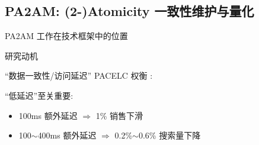\subsection{PA2AM: (2-)Atomicity 一致性维护与量化}

\begin{frame}{PA2AM 工作在技术框架中的位置}
\end{frame}
\begin{frame}{研究动机}
  \vspace{0.20cm}

  \pause
  ``数据一致性/访问延迟'' PACELC 权衡 :



  \pause

  ``低延迟''至关重要:
  \begin{itemize}
	\item 100ms 额外延迟 $\Rightarrow$ 1\% 销售下滑 \href{http://glinden.blogspot.com/2006/11/marissa-mayer-at-web-20.html}{}
	\item 100$\sim$400ms 额外延迟 $\Rightarrow$ 0.2\%$\sim$0.6\% 搜索量下降 \href{Speed Matters for Google Web Search}{}
  \end{itemize}

\end{frame}
